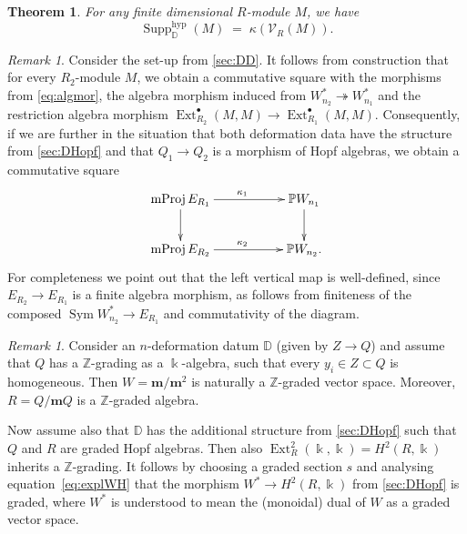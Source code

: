 \documentclass{amsart}
\numberwithin{equation}{section}
\newtheorem{theorem}[subsubsection]{Theorem}
\theoremstyle{definition}
\theoremstyle{remark}
\newtheorem{remark}[subsubsection]{Remark}
\newcommand{\Sym}{\operatorname{Sym}}
\newcommand{\bk}{\Bbbk}
\newcommand{\mZ}{\mathbb{Z}}
\newcommand{\hyp}{\mathrm{hyp}}
\newcommand{\tto}{\twoheadrightarrow}
\newcommand{\Ext}{\operatorname{Ext}}
\newcommand{\Supp}{\operatorname{Supp}}
\newcommand{\mProj}{\operatorname{mProj}}
\newcommand{\fm}{\mathbf{m}}
\newcommand{\cV}{\mathcal{V}}
\newcommand{\mD}{\mathbb{D}}
\newcommand{\mP}{\mathbb{P}}
\begin{document}
\begin{theorem}\cite[Theorem~7.1]{NP2}\label{thm:NP}
For any finite dimensional $R$-module $M$, we have
\[\Supp_{\mD}^{\hyp}(M)\;=\;\kappa\left(\cV_R(M)\right).\]
\end{theorem}



\begin{remark}\label{rem:nat}
Consider the set-up from \ref{sec:DD}. It follows from construction that for every $R_2$-module $M$, we obtain a commutative square with the morphisms from \eqref{eq:algmor}, the algebra morphism induced from $W_{n_2}^\ast\tto W_{n_1}^\ast$ and the restriction algebra morphism $\Ext^\bullet_{R_2}(M,M)\to\Ext^\bullet_{R_1}(M,M)$. Consequently, if we are further in the situation that both deformation data have the structure from \ref{sec:DHopf} and that $Q_1\to Q_2$ is a morphism of Hopf algebras, we obtain a commutative square
\[\xymatrix{\mProj E_{R_1}\ar[rr]^{\kappa_1}\ar[d]&& \mP W_{n_1}\ar[d]\\
\mProj E_{R_2}\ar[rr]^{\kappa_2}&& \mP W_{n_2} .}\]
For completeness we point out that the left vertical map is well-defined, since $E_{R_2}\to E_{R_1}$ is a finite algebra morphism, as follows from finiteness of the composed $\Sym W_{n_2}^\ast\to E_{R_1}$ and commutativity of the diagram.
\end{remark}


\begin{remark}\label{rem:grad}
Consider an $n$-deformation datum $\mD$ (given by $Z\to Q$) and assume that $Q$ has a $\mZ$-grading as a $\bk$-algebra, such that every $y_i\in Z\subset Q$ is homogeneous. Then $W=\fm/\fm^2$ is naturally a $\mZ$-graded vector space. Moreover, $R=Q/\fm Q$ is a $\mZ$-graded algebra.

Now assume also that $\mD$ has the additional structure from \ref{sec:DHopf} such that $Q$ and $R$ are graded Hopf algebras. Then also $\Ext^2_R(\bk,\bk)=H^2(R,\bk)$ inherits a $\mZ$-grading. It follows by choosing a graded section $s$ and analysing equation~\eqref{eq:explWH} that the morphism $W^\ast\to H^2(R,\bk)$ from \ref{sec:DHopf} is graded, where $W^\ast$ is understood to mean the (monoidal) dual of $W$ as a graded vector space.
\end{remark}
\end{document}
